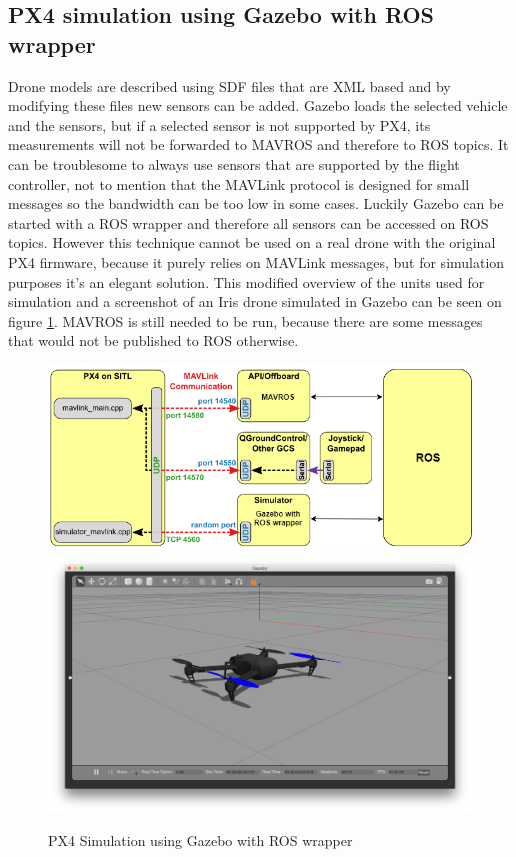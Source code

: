 \subsection{PX4 simulation using Gazebo with ROS wrapper}

Drone models are described using SDF files that are XML based and by modifying these files new sensors can 
be added. Gazebo loads the selected vehicle and the sensors, but if a selected sensor is not supported by
PX4, its measurements will not be forwarded to MAVROS and therefore to ROS topics. It can be troublesome 
to always use sensors that are supported by the flight controller, not to mention that the MAVLink protocol 
is designed for small messages so the bandwidth can be too low in some cases. Luckily Gazebo can 
be started with a ROS wrapper and therefore all sensors can be accessed on ROS topics. However this technique
cannot be used on a real drone with the original PX4 firmware, because it purely relies on MAVLink messages, 
but for simulation purposes it's an elegant solution. This modified overview of the units used for simulation
and a screenshot of an Iris drone simulated in Gazebo can be seen on figure \ref{fig:px4_sitl_ros_wrapper}. 
MAVROS is still needed to be run, because there are some messages that would not be published to ROS otherwise.

\begin{figure}[h]
    \centering
    \includegraphics[width=140mm, keepaspectratio]{figures/px4_sitl_with_ros.png}
    \includegraphics[width=140mm]{figures/iris_gazebo.png}
    \caption{PX4 Simulation using Gazebo with ROS wrapper}
    \label{fig:px4_sitl_ros_wrapper}
\end{figure}

